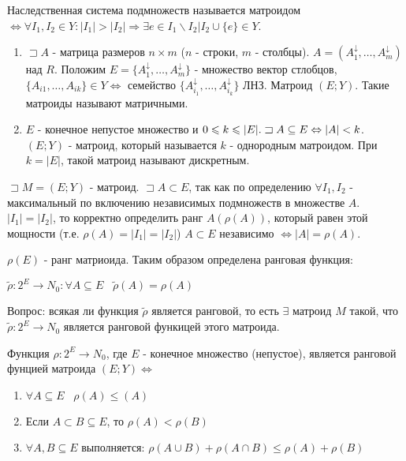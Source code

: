 \oprk Наследственная система подмножеств называется матроидом $\Leftrightarrow \forall I_1,I_2 \in Y : |I_1|>|I_2| \Rightarrow \exists e \in I_1 \backslash I_2 | I_2 \cup \{ e \} \in Y$.\\

\example 
\begin{enumerate}
\item $\sqsupset A$ - матрица размеров $n \times m$ ($n$ - строки, $m$ - столбцы).
$A = (A^{\downarrow}_1, \ldots , A^{\downarrow}_m)$ над $R$. Положим $ E = \{ A^{\downarrow}_1,\ldots,A^{\downarrow}_m \}$ - множество вектор стлобцов, $ \{ A_{i1}, \ldots, A_{ik} \} \in Y \Leftrightarrow$ семейство $ \{ A^{\downarrow}_{i_1}, \ldots, A^{\downarrow}_{i_k} \} $ ЛНЗ.
Матроид $(E;Y)$. Такие матроиды называют матричными. 

\item $E$ - конечное непустое множество и $0 \leqslant k \leqslant |E|. \\\sqsupset A \subseteq E \Leftrightarrow |A| < k $. $ (E;Y) $ - матроид, который называется  $k$ - однородным матроидом. При $k = |E|$, такой матроид называют дискретным. 
\end{enumerate}

\opr $\sqsupset M = (E;Y)$ - матроид. $ \sqsupset A \subset E$, так как по определению $\forall I_1,I_2$ - максимальный по включению независимых подмножеств в множестве $A$. $|I_1| = |I_2|$, то корректно определить ранг $A(\rho(A))$, который равен этой мощности (т.е. $\rho(A) = |I_1| = |I_2|$) $A \subset E $ независимо  $\Leftrightarrow |A| = \rho(A).$\par$ \rho(E) $ - ранг матриоида. Таким образом определена ранговая функция:\par
$\tilde{\rho}:2^E \rightarrow N_0 : \forall A \subseteq E \;\;\; \tilde\rho(A) = \rho(A)$

Вопрос: всякая ли функция $\tilde\rho$ является ранговой, то есть $\exists$ матроид $M$ такой, что $\tilde\rho:2^E \rightarrow N_0$ является ранговой функицей этого матроида.

\thr Функция $\rho : 2^E \rightarrow N_0$, где $E$ - конечное множество (непустое), является ранговой фунцией матроида $(E;Y) \Leftrightarrow$
\begin{enumerate}
\item $\forall A \subseteq E \;\;\;  \rho(A) \leqslant (A)$
\item Если $ A \subset B \subseteq E$, то $\rho(A) < \rho(B)$
\item $\forall A,B \subseteq E$ выполняется:
$\rho(A \cup B) + \rho(A \cap B) \leqslant \rho(A) + \rho(B)$
\end{enumerate} 

